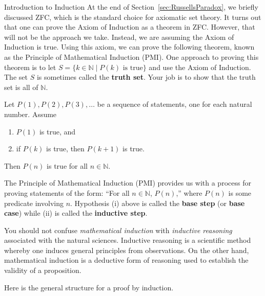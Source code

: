 \begin{section}{Introduction to Induction}
At the end of Section~\ref{sec:RussellsParadox}, we briefly discussed ZFC, which is the standard choice for axiomatic set theory. It turns out that one can prove the Axiom of Induction as a theorem in ZFC.  However, that will not be the approach we take.  Instead, we are assuming the Axiom of Induction is true. Using this axiom, we can prove the following theorem, known as the Principle of Mathematical Induction (PMI). One approach to proving this theorem is to let $S=\{k\in \mathbb{N}\mid P(k) \text{ is true}\}$ and use the Axiom of Induction.  The set $S$ is sometimes called the \textbf{truth set}.  Your job is to show that the truth set is all of $\mathbb{N}$.

\begin{theorem}\label{thm:PMI}
Let $P(1), P(2), P(3), \ldots$ be a sequence of statements, one for each natural number. Assume
\begin{enumerate}[label=\textrm{(\roman*)}]
\item $P(1)$ is true, and
\item if $P(k)$ is true, then $P(k+1)$ is true.
\end{enumerate}
Then $P(n)$ is true for all $n\in\mathbb{N}$.
\end{theorem}

The Principle of Mathematical Induction (PMI) provides us with a process for proving statements of the form: ``For all $n\in\mathbb{N}$, $P(n)$,'' where $P(n)$ is some predicate involving $n$.  Hypothesis (i) above is called the \textbf{base step} (or \textbf{base case}) while (ii) is called the \textbf{inductive step}.

You should not confuse \emph{mathematical induction} with \emph{inductive reasoning} associated with the natural sciences. Inductive reasoning is a scientific method whereby one induces general principles from observations. On the other hand, mathematical induction is a deductive form of reasoning used to establish the validity of a proposition.

\begin{skeleton}
Here is the general structure for a proof by induction.

\begin{center}
\end{center}
\end{skeleton}
\end{section}
